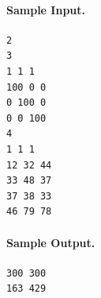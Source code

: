 \documentclass[11pt]{article}
\begin{document}
\paragraph{Sample Input.}
\begin{verbatim}
2
3
1 1 1
100 0 0
0 100 0
0 0 100
4
1 1 1
12 32 44
33 48 37
37 38 33
46 79 78
\end{verbatim}

\paragraph{Sample Output.}
\begin{verbatim}
300 300
163 429
\end{verbatim}
\end{document}

